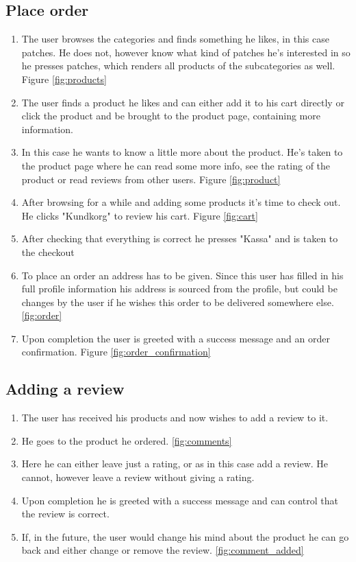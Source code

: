 \documentclass[paper=a4, fontsize=11pt]{report} %
\begin{document}
	\subsection*{Place order}
	\begin{enumerate}
		\item The user browses the categories and finds something he likes, in this case patches. He does not, however know what kind of patches he's interested in so he presses patches, which renders all products of the subcategories as well. Figure \ref{fig:products}
		\item The user finds a product he likes and can either add it to his cart directly or click the product and be brought to the product page, containing more information.
		\item In this case he wants to know a little more about the product. He's taken to the product page where he can read some more info, see the rating of the product or read reviews from other users. Figure \ref{fig:product}
		\item After browsing for a while and adding some products it's time to check out. He clicks "Kundkorg" to review his cart. Figure \ref{fig:cart}
		\item After checking that everything is correct he presses "Kassa" and is taken to the checkout
		\item To place an order an address has to be given. Since this user has filled in his full profile information his address is sourced from the profile, but could be changes by the user if he wishes this order to be delivered somewhere else. \ref{fig:order}
		\item Upon completion the user is greeted with a success message and an order confirmation. Figure \ref{fig:order_confirmation}
	\end{enumerate}

	\subsection*{Adding a review}
	\begin{enumerate}
		\item The user has received his products and now wishes to add a review to it.
		\item He goes to the product he ordered. \ref{fig:comments}
		\item Here he can either leave just a rating, or as in this case add a review. He cannot, however leave a review without giving a rating.
		\item Upon completion he is greeted with a success message and can control that the review is correct.
		\item If, in the future, the user would change his mind about the product he can go back and either change or remove the review. \ref{fig:comment_added}
	\end{enumerate}
\end{document}
